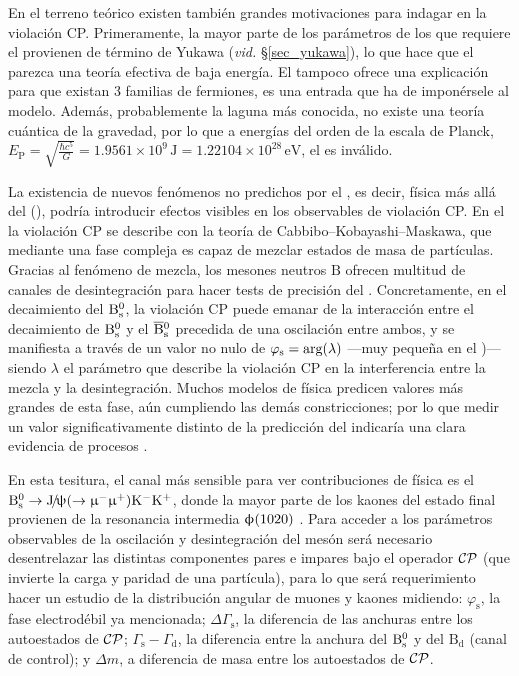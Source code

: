 En el terreno teórico existen también grandes motivaciones para indagar en la violación CP. 
Primeramente, la mayor parte de los parámetros de los que requiere el \stdmod provienen de término de Yukawa (\emph{vid.} \S\ref{sec_yukawa}), lo que hace que el \stdmod parezca una teoría efectiva de baja energía. El \stdmod tampoco ofrece una explicación para que existan 3 familias de fermiones, es una entrada que ha de imponérsele al modelo. Además, probablemente la laguna más conocida, no existe una teoría cuántica de la gravedad, por lo que a energías del orden de la escala de Planck, $E_\mathrm{P} = \sqrt{\frac{\hbar c^5}{G}} =  1.9561\times10^{9} \, \mathrm{J} = 1.22104\times10^{28} \, \mathrm{eV}$, el \stdmod es inválido.


La existencia de nuevos fenómenos no predichos por el \stdmod, es decir, física más allá del \stdmod (\bstdmod), podría introducir efectos visibles en los observables de violación CP. En el \stdmod la violación CP se describe con la teoría de Cabbibo--Kobayashi--Maskawa, que mediante una fase compleja es capaz de mezclar estados de masa de partículas.
Gracias al fenómeno de mezcla, los mesones neutros $\mathrm{B}$ ofrecen multitud de canales de desintegración para hacer tests de precisión del  \stdmod.
Concretamente, en el decaimiento del $\text{B}{}_{\text{s}}^{0}$, la violación CP puede emanar de la interacción entre el decaimiento de $\text{B}{}_{\text{s}}^{0}$ y el $\overline{\text{B}}{}_{\text{s}}^{0}$  precedida de una oscilación entre ambos, y se manifiesta a través de un valor no nulo de $\varphi_{\text{s}} = \text{arg}(\lambda)$ ---muy pequeña en el \stdmod)--- siendo $\lambda$ el parámetro que describe la violación CP en la interferencia entre la mezcla y la desintegración.
Muchos modelos de física \bstdmod predicen valores más grandes de esta fase, aún cumpliendo las demás constricciones; por lo que medir un valor significativamente distinto de la predicción del \stdmod indicaría una clara evidencia de procesos \bstdmod.


En esta tesitura, el canal más sensible para ver contribuciones de física \bstdmod es el $\text{B}{}_{\text{s}}^{0} \rightarrow \text{J}\!/\!\uppsi(\rightarrow \upmu{}^{-} \upmu{}^{+}) \text{K}{}^{-} \text{K}{}^{+}$, donde la mayor parte de los kaones del estado final provienen de la resonancia intermedia $\upphi(1020)$ \cite{faller2009precision}. Para acceder a los parámetros observables de la oscilación y desintegración del mesón será necesario desentrelazar las distintas componentes pares e impares bajo el operador $\mathcal{CP}$ (que invierte la carga y paridad de una partícula), para lo que será requerimiento hacer un estudio de la distribución angular de muones y kaones midiendo: $\varphi_{\text{s}}$, la fase electrodébil ya mencionada;  $\Delta\Gamma_{\text{s}}$, la diferencia de las anchuras entre los autoestados de $\mathcal{CP}$; $\Gamma_{\text{s}}-\Gamma_{\text{d}}$, la diferencia entre la anchura del $\text{B}{}_{\text{s}}^{0}$ y del $\text{B}_{\text{d}}$ (canal de control); y $\Delta m$, a diferencia de masa entre los autoestados de $\mathcal{CP}$.


